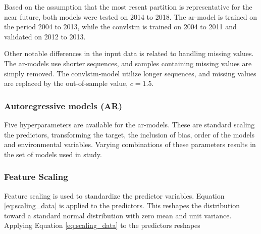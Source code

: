Based on the assumption that the most resent partition is representative for the near future, both models were tested on 2014 to 2018. The \acrshort{ar}-model is trained on the period 2004 to 2013, while the \acrshort{convlstm} is trained on  2004 to 2011 and validated on 2012 to 2013.

Other notable differences in the input data is related to handling missing values.  
The \acrshort{ar}-models use shorter sequences, and samples containing missing values are simply removed. The \acrshort{convlstm}-model utilize longer sequences, and missing values are replaced by the out-of-sample value, $c=1.5$. 

\subsubsection{Autoregressive models (AR)}
Five hyperparameters are available for the \acrshort{ar}-models. These are standard scaling the predictors, transforming the target, the inclusion of bias, order of the models and environmental variables. Varying combinations of these parameters results in the set of models used in study. 

\subsubsection{Feature Scaling} \label{sec:scaling_predictors}
Feature scaling is used to standardize the predictor variables.
Equation \eqref{eq:scaling_data} is applied to the predictors. This 
reshapes the distribution toward a standard normal distribution with zero mean and unit variance. 
Applying Equation \eqref{eq:scaling_data} to the predictors reshapes %

